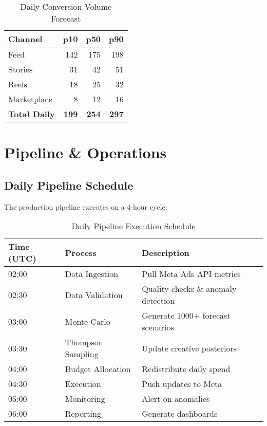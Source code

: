 \documentclass[11pt,a4paper]{report}
\begin{document}
\begin{table}[H]
\centering
\begin{tabular}{|l|r|r|r|}
\hline
\rowcolor{aelpblue!20}
\textbf{Channel} & \textbf{p10} & \textbf{p50} & \textbf{p90} \\
\hline
Feed & 142 & 175 & 198 \\
Stories & 31 & 42 & 51 \\
Reels & 18 & 25 & 32 \\
Marketplace & 8 & 12 & 16 \\
\hline
\textbf{Total Daily} & \textbf{199} & \textbf{254} & \textbf{297} \\
\hline
\end{tabular}
\caption{Daily Conversion Volume Forecast}
\end{table}

\clearpage

\chapter{Pipeline \& Operations}

\section{Daily Pipeline Schedule}

The production pipeline executes on a 4-hour cycle:

\begin{table}[H]
\centering
\begin{tabular}{|l|l|p{6cm}|}
\hline
\rowcolor{aelpblue!20}
\textbf{Time (UTC)} & \textbf{Process} & \textbf{Description} \\
\hline
02:00 & Data Ingestion & Pull Meta Ads API metrics \\
02:30 & Data Validation & Quality checks \& anomaly detection \\
03:00 & Monte Carlo & Generate 1000+ forecast scenarios \\
03:30 & Thompson Sampling & Update creative posteriors \\
04:00 & Budget Allocation & Redistribute daily spend \\
04:30 & Execution & Push updates to Meta \\
05:00 & Monitoring & Alert on anomalies \\
06:00 & Reporting & Generate dashboards \\
\hline
\end{tabular}
\caption{Daily Pipeline Execution Schedule}
\end{table}
\end{document}
